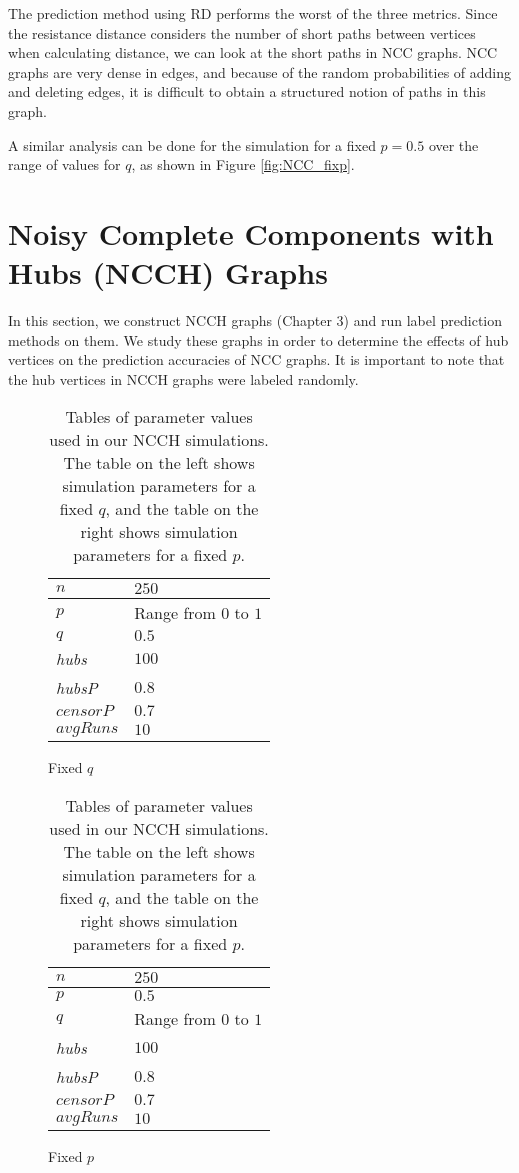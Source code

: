 The prediction method using RD performs the worst of the three metrics.
Since the resistance distance considers the number of short paths between
vertices when calculating distance, we can look at the short paths in NCC
graphs. NCC graphs are very dense in edges, and because of the random
probabilities of adding and deleting edges, it is difficult to obtain a
structured notion of paths in this graph.

A similar analysis can be done for the simulation for a fixed $p=0.5$ over
the range of values for $q$, as shown in Figure \ref{fig:NCC_fixp}.


\section{Noisy Complete Components with Hubs (NCCH) Graphs}
In this section, we construct NCCH graphs (Chapter 3) and run label 
prediction methods on them. We study these graphs in order to determine the
effects of hub vertices on the prediction accuracies of NCC graphs. It is
important to note that the hub vertices in NCCH graphs were labeled 
randomly.

\begin{table}[H]
\centering
\begin{subfigure}[h]{0.4\linewidth}
\begin{tabular}{|l|l|}
\hline
$n$ & $250$ \\ \hline
$p$ & Range from $0$ to $1$\\ \hline
$q$ & $0.5$\\ \hline
\textit{hubs} & $100$\\ \hline
\textit{hubsP} & $0.8$\\ \hline
$censorP$ & $0.7$\\ \hline
$avgRuns$ & $10$\\ \hline
\end{tabular}
\caption{Fixed $q$}
\end{subfigure}
\hfill
\begin{subfigure}[h]{0.4\linewidth}
\begin{tabular}{|l|l|}
\hline
$n$ & $250$ \\ \hline
$p$ & $0.5$\\ \hline
$q$ & Range from $0$ to $1$\\ \hline
\textit{hubs} & $100$\\ \hline
\textit{hubsP} & $0.8$\\ \hline
$censorP$ & $0.7$\\ \hline
$avgRuns$ & $10$\\ \hline
\end{tabular}
\caption{Fixed $p$}
\end{subfigure}%
\caption{Tables of parameter values used in our NCCH simulations. The table
on the left shows simulation parameters for a fixed $q$, and the table on
the right shows simulation parameters for a fixed $p$.}
\label{table:NCCH-params}
\end{table}

